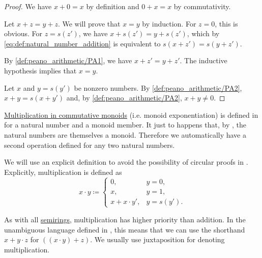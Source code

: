 \begin{proof}
   We have \( x + 0 = x \) by definition and \( 0 + x = x \) by commutativity.

   Let \( x + z = y + z \). We will prove that \( x = y \) by induction\IND. For \( z = 0 \), this is obvious. For \( z = s(z') \), we have \( x + s(z') = y + s(z') \), which by \eqref{eq:def:natural_number_addition} is equivalent to \( s(x + z') = s(y + z') \).

  By \ref{def:peano_arithmetic/PA1}, we have \( x + z' = y + z' \). The inductive hypothesis implies that \( x = y \).

   Let \( x \) and \( y = s(y') \) be nonzero numbers. By \ref{def:peano_arithmetic/PA2}, \( x + y = s(x + y') \) and, by \ref{def:peano_arithmetic/PA2}, \( x + y \neq 0 \).
\end{proof}

\begin{definition}\label{def:natural_number_multiplication}
  \hyperref[rem:additive_magma/multiplication]{Multiplication in commutative monoids} (i.e. monoid exponentiation) is defined in  for a natural number and a monoid member. It just to happens that, by , the natural numbers are themselves a monoid. Therefore we automatically have a second  operation defined for any two natural numbers.

  We will use an explicit definition to avoid the possibility of circular proofs in . Explicitly, multiplication is defined as
  \begin{equation}\label{eq:def:natural_number_multiplication}
    x \cdot y \coloneqq \begin{cases}
      0,              &y = 0,     \\
      x,              &y = 1,     \\
      x + x \cdot y', &y = s(y').
    \end{cases}
  \end{equation}

  As with all \hyperref[def:semiring]{semirings}, multiplication has higher priority than addition. In the unambiguous language defined in , this means that we can use the shorthand \( x + y \cdot z \) for \( ((x \cdot y) + z) \). We usually use juxtaposition for denoting multiplication.
\end{definition}

